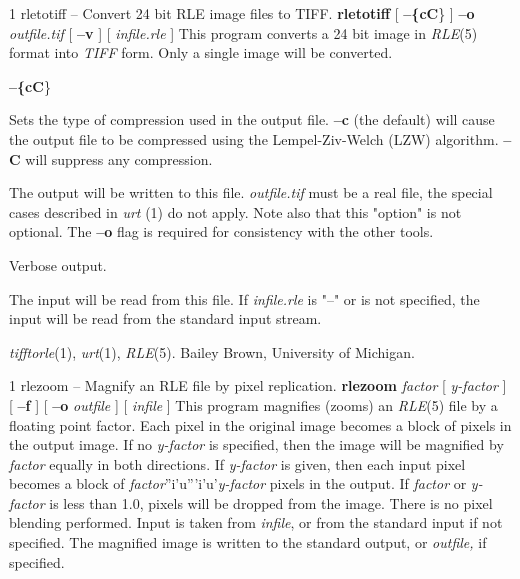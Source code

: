 %
%
%
 1
rletotiff -- Convert 24 bit RLE image files to TIFF.
{\bf rletotiff}
[
{\bf --\{cC}\}
]
{\bf --o} 
{\it outfile.tif}
[
{\bf --v}
] [ 
{\it infile.rle}
]
This program converts a 24 bit image in
{\it RLE}{\rm (5)}
format into 
{\it TIFF}
form.  Only a single image will be converted.
\begin{TPlist}{{\bf --\{cC}\}}
\item[{{\bf --\{cC}\}}]
Sets the type of compression used in the output file.  
{\bf --c}
(the default) will cause the output file to be compressed using the
Lempel-Ziv-Welch (LZW) algorithm.
{\bf --C}
will suppress any compression.
\item[{{\bf --o}{\it \ outfile.tif}
}]
The output will be written to this file.  
{\it outfile.tif}
must be a real file, the special cases described in
{\it urt} (1)
do not apply.  Note also that this "option" is not optional.  The
{\bf --o}
flag is required for consistency with the other tools.
\item[{{\bf --v}}]
Verbose output.
\item[{{\it infile.rle}}]
The input will be read from this file.  If
{\it infile.rle}
is "--" or is not specified, the input will be read from the standard
input stream.
\end{TPlist}
{\it tifftorle}{\rm (1),}
{\it urt}{\rm (1),}
{\it RLE}{\rm (5).}
Bailey Brown, University of Michigan.
\newpage


%
%
%
 1
rlezoom -- Magnify an RLE file by pixel replication.
{\bf rlezoom}
{\it factor}
[ 
{\it y-factor}
] [
{\bf --f}
] [
{\bf --o}
{\it outfile}
] [
{\it infile}
]
This program magnifies (zooms) an
{\it RLE}{\rm (5)}
file by a floating point factor.  Each pixel in the original image becomes
a block of pixels in the output image.  If no
{\it y-factor}
is specified, then the image will be magnified by
{\it factor}
equally in both directions.  If 
{\it y-factor}
is given, then each input pixel becomes a block of
{\it factor}{\rm ''i'u'''i'u'}{\it y-factor}
pixels in the output.  If
{\it factor}
or
{\it y-factor}
is less than 1.0, pixels will be dropped from the image.  There is no
pixel blending performed.  Input is taken from 
{\it infile}{\rm ,}
or from the standard input if not specified.  The magnified image is
written to the standard output, or
{\it outfile,}
if specified.

